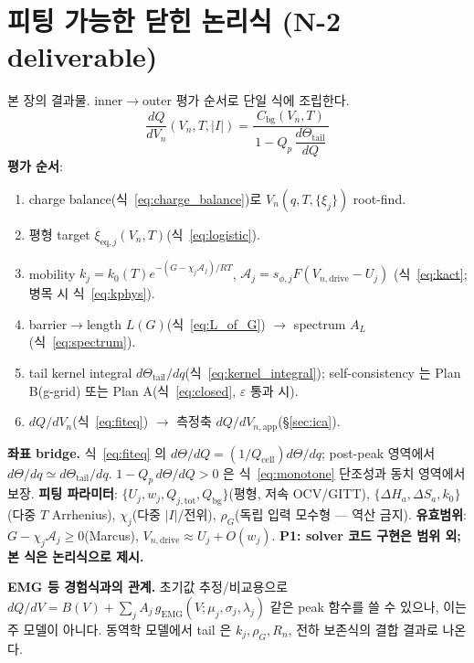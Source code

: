 \documentclass[11pt,a4paper]{article}
\newcommand{\eq}{\mathrm{eq}}
\newcommand{\app}{\mathrm{app}}
\newcommand{\drive}{\mathrm{drive}}
\newcommand{\tot}{\mathrm{tot}}
\newcommand{\bg}{\mathrm{bg}}
\newcommand{\cell}{\mathrm{cell}}
\begin{document}
\section{피팅 가능한 닫힌 논리식 (N-2 deliverable)}\label{sec:fiteq}
본 장의 결과물. inner$\to$outer 평가 순서로 단일 식에 조립한다.
\begin{equation}
\boxed{\;\frac{dQ}{dV_n}(V_n,T,|I|)=\frac{C_\bg(V_n,T)}{\,1-Q_p\,\dfrac{d\Theta_\mathrm{tail}}{dQ}\,}\;}
\label{eq:fiteq}
\end{equation}
\textbf{평가 순서}:
\begin{enumerate}[label=\textbf{S\arabic*.},leftmargin=2.2em]
\item charge balance(식~\eqref{eq:charge_balance})로 $V_n(q,T,\{\xi_j\})$ root-find.
\item 평형 target $\xi_{\eq,j}(V_n,T)$(식~\eqref{eq:logistic}).
\item mobility $k_j=k_0(T)e^{-(G-\chi_j\mathcal A_j)/RT}$, $\mathcal A_j=s_{\phi,j}F(V_{n,\drive}-U_j)$
  (식~\eqref{eq:kact}; 병목 시 식~\eqref{eq:kphys}).
\item barrier$\to$length $L(G)$(식~\eqref{eq:L_of_G}) $\to$ spectrum $A_L$(식~\eqref{eq:spectrum}).
\item tail kernel integral $d\Theta_\mathrm{tail}/dq$(식~\eqref{eq:kernel_integral}); self-consistency 는
  Plan B(g-grid) 또는 Plan A(식~\eqref{eq:closed}, $\varepsilon$ 통과 시).
\item $dQ/dV_n$(식~\eqref{eq:fiteq}) $\to$ 측정축 $dQ/dV_{n,\app}$(\S\ref{sec:ica}).
\end{enumerate}
\textbf{좌표 bridge.} 식~\eqref{eq:fiteq} 의 $d\Theta/dQ=(1/Q_\cell)d\Theta/dq$; post-peak 영역에서
$d\Theta/dq\simeq d\Theta_\mathrm{tail}/dq$. $1-Q_p\,d\Theta/dQ>0$ 은 식~\eqref{eq:monotone} 단조성과
동치 영역에서 보장.
\textbf{피팅 파라미터}: $\{U_j,w_j,Q_{j,\tot},Q_\bg\}$(평형, 저속 OCV/GITT), $\{\Delta H_a,\Delta S_a,k_0\}$
(다중 $T$ Arrhenius), $\chi_j$(다중 $|I|$/전위), $\rho_G$(독립 입력 모수형 — 역산 금지).
\textbf{유효범위}: $G-\chi_j\mathcal A_j\ge0$(Marcus), $V_{n,\drive}\approx U_j+O(w_j)$.
\textbf{P1: solver 코드 구현은 범위 외; 본 식은 논리식으로 제시.}

\textbf{EMG 등 경험식과의 관계.} 초기값 추정/비교용으로
$dQ/dV=B(V)+\sum_j A_j\,g_\mathrm{EMG}(V;\mu_j,\sigma_j,\lambda_j)$ 같은 peak 함수를 쓸 수 있으나, 이는
주 모델이 아니다. 동역학 모델에서 tail 은 $k_j,\rho_G,R_n$, 전하 보존식의 결합 결과로 나온다.

\end{document}
